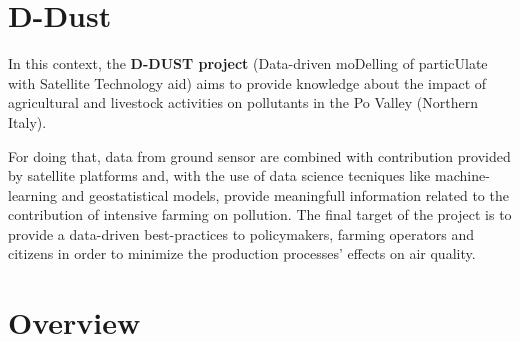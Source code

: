 \begin{comment}
 
In view of the above, the D-DUST project focuses on the development of new means to improve both understanding and local monitoring of farming-related PM. The project will primarily consider the Po Valley portion belonging to the Lombardy Region as a testbed for the activities. The aim of D-DUST is to assess the contribution (in terms operability, cost-effectiveness, and accuracy improvement) deriving by the systematic integration of non-conventional data, with a focus on satellite-based PM estimates, into traditional PM monitoring frameworks based on fixed ground-sensors. Data ingestion to support traditional PM monitoring and modelling will take the best advantage of data science techniques throughout the combination of machine-learning and geostatistical models. The satellite-based PM prediction modelling aims at improving the granularity of the available ground-based PM measurements to enable exposure and source apportionment models to better account for time and space variability of exposure patterns. Periodical high- detailed PM observations from on-site sampling with chemical characterization will support the modelling activities by providing valuable information for models’ training and validation and targeting intensive farming activities as the focal emission source. Reproducibility of the research activities will be promoted by openly distributing most meaningful analysis data and leveraging the use of free and open-source software technologies along the whole data analysis process.
The ultimate project goal is to develop data-driven best-practices to be transferred to operational air quality monitoring and policymaking, by spelling out data requirements, analysis patterns, software and hardware equipment, and technical skills that are demanded to operate the proposed methods. The availability of these new informational assets
 in order to evaluate a model capable of making predictions through machine learning tecniques. \par
Indeed, gound-based measurement stations cannot cover each areas. So in order to provide estimates and forecasts that could be replicated satellite platforms data are collected.

\end{comment}
\section{D-Dust}
In this context, the \textbf{D-DUST project} (Data-driven moDelling of particUlate with Satellite Technology aid) aims to provide knowledge about the impact of agricultural and livestock activities on pollutants in the Po Valley (Northern Italy).\par 
For doing that, data from ground sensor are combined with contribution provided by satellite platforms and, with the use of data science tecniques like machine-learning and geostatistical models, provide meaningfull information related to the contribution of intensive farming on pollution.
The final target of the project is to provide a data-driven best-practices to policymakers, farming operators and citizens in order to minimize the production processes' effects on air quality.


\section{Overview}


